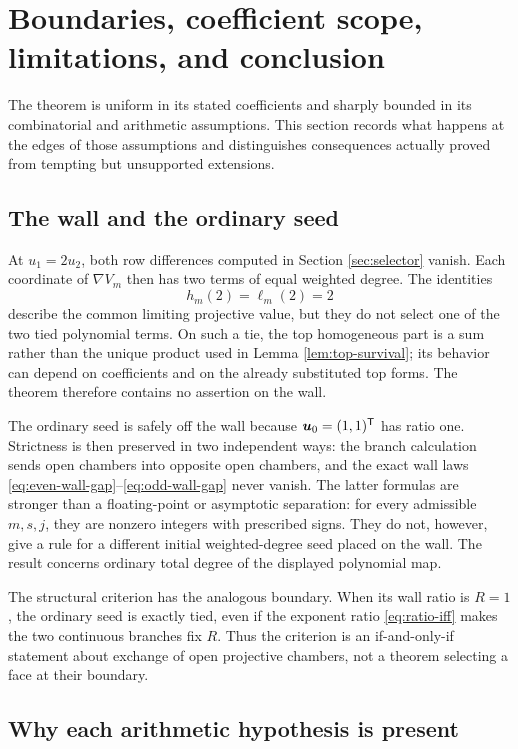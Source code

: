 \documentclass[11pt]{article}
\theoremstyle{definition}
\theoremstyle{remark}
\begin{document}
\section{Boundaries, coefficient scope, limitations, and conclusion}
\label{sec:boundaries}

The theorem is uniform in its stated coefficients and sharply bounded in its
combinatorial and arithmetic assumptions.  This section records what happens
at the edges of those assumptions and distinguishes consequences actually
proved from tempting but unsupported extensions.

\subsection{The wall and the ordinary seed}

At \(u_1=2u_2\), both row differences computed in Section
\ref{sec:selector} vanish.  Each coordinate of \(\nabla V_m\) then has two
terms of equal weighted degree.  The identities
\[
h_m(2)=\ell_m(2)=2
\]
describe the common limiting projective value, but they do not select one of
the two tied polynomial terms.  On such a tie, the top homogeneous part is a
sum rather than the unique product used in Lemma \ref{lem:top-survival}; its
behavior can depend on coefficients and on the already substituted top
forms.  The theorem therefore contains no assertion on the wall.

The ordinary seed is safely off the wall because
\(\boldsymbol{u}_0=(1,1)^{\mathsf{T}}\) has ratio one.  Strictness is then preserved in two
independent ways: the branch calculation sends open chambers into opposite
open chambers, and the exact wall laws
\eqref{eq:even-wall-gap}--\eqref{eq:odd-wall-gap} never vanish.  The latter
formulas are stronger than a floating-point or asymptotic separation: for
every admissible \(m,s,j\), they are nonzero integers with prescribed signs.
They do not, however, give a rule for a different initial weighted-degree
seed placed on the wall.  The result concerns ordinary total degree of the
displayed polynomial map.

The structural criterion has the analogous boundary.  When its wall ratio is
\(R=1\), the ordinary seed is exactly tied, even if the exponent ratio
\eqref{eq:ratio-iff} makes the two continuous branches fix \(R\).  Thus the
criterion is an if-and-only-if statement about exchange of open projective
chambers, not a theorem selecting a face at their boundary.

\subsection{Why each arithmetic hypothesis is present}
\end{document}
